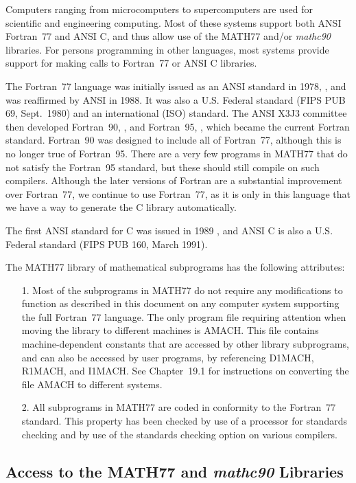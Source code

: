\documentclass[twoside]{MATH77}
\begin{document}
Computers ranging from microcomputers to supercomputers are used for
scientific and engineering computing.  Most of these systems support both ANSI
Fortran~77 and ANSI C, and thus allow use of the MATH77 and/or {\em mathc90}
libraries.  For persons programming in other languages, most systems provide
support for making calls to Fortran~77 or ANSI C libraries.

The Fortran~77 language was initially issued as an ANSI standard in 1978,
\cite{Fortran77}, and was reaffirmed by ANSI in 1988.  It was also a U.S.
Federal standard (FIPS PUB 69, Sept.~1980) and an international (ISO)
standard.  The ANSI X3J3 committee then developed Fortran~90,
\cite{Fortran90}, and Fortran~95, \cite{Fortran95}, which became the
current Fortran standard.  Fortran~90 was designed to include all of
Fortran~77, although this is no longer true of Fortran~95.  There are a
very few programs in MATH77 that do not satisfy the Fortran~95 standard,
but these should still compile on such compilers.  Although the later
versions of Fortran are a substantial improvement over Fortran~77, we
continue to use Fortran~77, as it is only in this language that we have a
way to generate the C library automatically.

The first ANSI standard for C was issued in 1989 \cite{C90}, and ANSI C is
also a U.S. Federal standard (FIPS PUB 160, March 1991).

The MATH77 library of mathematical subprograms has the following
attributes:
\begin{itemize}
\item[1.] Most of the subprograms in MATH77 do not require any
modifications to function as described in this document on any computer
system supporting the full Fortran~77 language.  The only program file
requiring attention when moving the library to different machines is
AMACH.  This file contains machine-dependent constants that are accessed
by other library subprograms, and can also be accessed by user programs,
by referencing D1MACH, R1MACH, and I1MACH.  See Chapter~19.1 for
instructions on converting the file AMACH to different systems.

\item[2.] All subprograms in MATH77 are coded in conformity to the Fortran~77
standard. This property has been checked by use of a processor for standards
checking and by use of the standards checking option on various compilers.
\end{itemize}

\subsection{Access to the MATH77 and {\em mathc90} Libraries}
\end{document}

